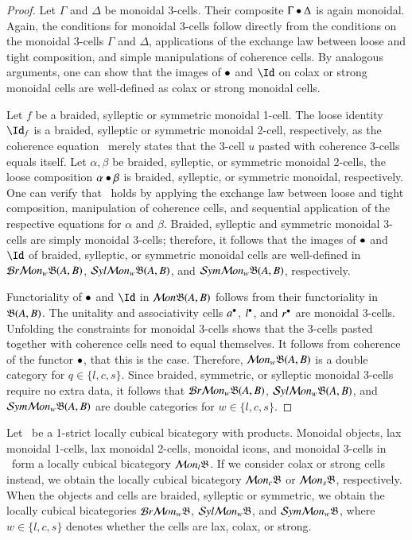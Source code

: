 \begin{proof}
Let $\Gamma$ and $\Delta$ be monoidal 3-cells. Their composite $\Gamma \bullet \Delta$ is again monoidal. Again, the conditions for monoidal 3-cells follow directly from the conditions on the monoidal 3-cells $\Gamma$ and $\Delta$, applications of the exchange law between loose and tight composition, and simple manipulations of coherence cells.
By analogous arguments, one can show that the images of $\bullet$ and $\looseid$ on colax or strong monoidal cells are well-defined as colax or strong monoidal cells. 

Let $f$ be a braided, sylleptic or symmetric monoidal 1-cell. The loose identity $\looseid_f$ is a braided, sylleptic or symmetric monoidal 2-cell, respectively, as the coherence equation~\cite[(BTA1) p143]{mccrudden:bal-coalgb} merely states that the 3-cell $u$ pasted with coherence 3-cells equals itself. Let $\alpha, \beta$ be braided, sylleptic, or symmetric monoidal 2-cells, the loose composition $\alpha \bullet \beta$ is braided, sylleptic, or symmetric monoidal, respectively. One can verify that~\cite[(BTA1) p143]{mccrudden:bal-coalgb} holds by applying the exchange law between loose and tight composition, manipulation of coherence cells, and sequential application of the respective equations for $\alpha$ and $\beta$.  Braided, sylleptic and symmetric monoidal 3-cells are simply monoidal 3-cells; therefore, it follows that the images of $\bullet$ and $\looseid$ of braided, sylleptic, or symmetric monoidal cells are well-defined in $\mathcal{B} r \mathcal{M} on_w\mathfrak{B}(A,B)$, $\mathcal{S} yl \mathcal{M} on_w\mathfrak{B}(A,B)$, and $\mathcal{S} ym \mathcal{M} on_w\mathfrak{B}(A,B)$, respectively.

Functoriality of $\bullet$ and $\looseid$ in $\mathcal{M} on \mathfrak{B}(A,B)$ follows from their functoriality in $\mathfrak{B}(A,B)$. 
The unitality and associativity cells $a^{\bullet}$, $l^{\bullet}$, and $r^{\bullet}$ are monoidal 3-cells. Unfolding the constraints for monoidal 3-cells shows that the 3-cells pasted together with coherence cells need to equal themselves. It follows from coherence of the functor $\bullet$, that this is the case. Therefore,  $\mathcal{M} on_w\mathfrak{B}(A,B)$ is a double category for $q \in \{l,c,s\}$. 
Since braided, symmetric, or sylleptic monoidal 3-cells require no extra data, it follows that $\mathcal{B} r \mathcal{M} on_w\mathfrak{B}(A,B)$, $\mathcal{S} yl \mathcal{M} on_w\mathfrak{B}(A,B)$, and $\mathcal{S} ym \mathcal{M} on_w\mathfrak{B}(A,B)$ are double categories for $w \in \{l,c,s\}$.
\end{proof}

\begin{thm}\label{thm:lcbc}
Let \fB\ be a 1-strict locally cubical bicategory with products. Monoidal objects, lax monoidal 1-cells, lax monoidal 2-cells, monoidal icons, and monoidal 3-cells in  \fB\ form a locally cubical bicategory $\mathcal{M} on_l\mathfrak{B}$. 
  If we consider colax or strong cells instead, we obtain the locally cubical bicategory $\mathcal{M} on_c\mathfrak{B}$ or $\mathcal{M} on_s\mathfrak{B}$, respectively. When the objects and cells are braided, sylleptic or symmetric,  we obtain the locally cubical bicategories $\mathcal{B} r \mathcal{M} on_w\mathfrak{B}$, $\mathcal{S} yl \mathcal{M} on_w\mathfrak{B}$, and $\mathcal{S} ym \mathcal{M} on_w\mathfrak{B}$, where $w \in \{l,c,s\}$ denotes whether the cells are lax, colax, or strong.
\end{thm}


